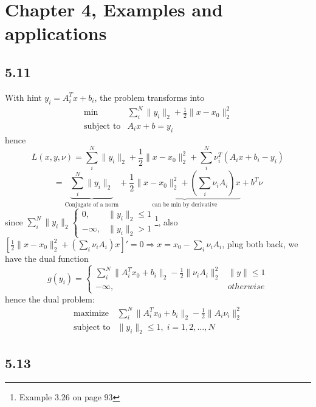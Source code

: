\documentclass{article}
\begin{document}
\section*{Chapter 4, Examples and applications}	
\subsection*{5.11}
With hint $y_i = A_i^Tx + b_i$, the problem transforms into
\[  \boxed{  \begin{array}{ll}
    \mbox{min}   &  \sum_i^N \|y_i\|_2  + \frac{1}{2}\|x - x_0\|_2^2 \\
    \mbox{subject to} & A_ix + b = y_i
         \end{array} 
         }
  \]    
  hence
\[L(x,y, \nu) = \sum_i^N \|y_i\|_2  +  \frac{1}{2}\|x - x_0\|_2^2 + \sum_i^N \nu_i^T(A_ix + b_i - y_i) \]
\[ = \underbrace{\sum_i^N \|y_i\|_2 }_{\mbox{Conjugate of a norm}}  + \underbrace{\frac{1}{2}\|x- x_0\|_2^2 + (\sum_i\nu_iA_i)x}_{\mbox{can be min by derivative}} + b^T\nu \]
since $\sum_i^N \|y_i\|_2 \begin{cases}
0, & \|y_i\|_2 \le 1\\
-\infty, & \|y_i\|_2 > 1
\end{cases}
$\footnote{Example 3.26 on page 93}, also $[\frac{1}{2}\|x- x_0\|_2^2 + (\sum_i\nu_iA_i)x]' = 0 \Rightarrow x = x_0 - \sum_i\nu_iA_i$, plug both back, we have the dual function
\[g(y_i) = \begin{cases}
 \sum_i^N \|A_i^Tx_0 + b_i\|_2  - \frac{1}{2}\|\nu_iA_i\|_2^2& \|y\| \le 1\\
-\infty, & otherwise
\end{cases}
\]
hence the dual problem: 
\[  \boxed{  \begin{array}{ll}
    \mbox{maximize}   &  \sum_i^N \|A_i^Tx_0 + b_i\|_2  - \frac{1}{2}\|A_i\nu_i\|_2^2 \\
    \mbox{subject to} & \|y_i\|_2 \le 1, \; i = 1, 2, \dots, N
         \end{array} 
         }
  \] 
\subsection*{5.13}
\end{document}
